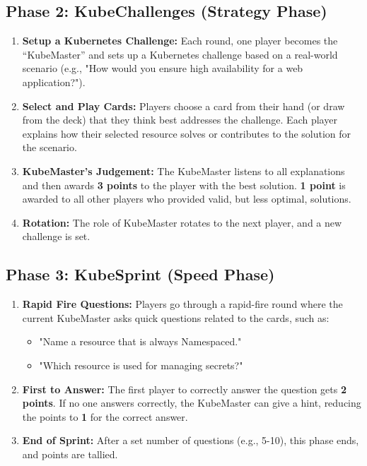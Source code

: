 \documentclass{article}
\begin{document}
\subsection*{Phase 2: KubeChallenges (Strategy Phase)}
\begin{enumerate}[label=\arabic*.]
    \item \textbf{Setup a Kubernetes Challenge:} Each round, one player becomes the “KubeMaster” and sets up a Kubernetes challenge based on a real-world scenario (e.g., "How would you ensure high availability for a web application?").
    
    \item \textbf{Select and Play Cards:} Players choose a card from their hand (or draw from the deck) that they think best addresses the challenge. Each player explains how their selected resource solves or contributes to the solution for the scenario.
    
    \item \textbf{KubeMaster's Judgement:} The KubeMaster listens to all explanations and then awards \textbf{3 points} to the player with the best solution. \textbf{1 point} is awarded to all other players who provided valid, but less optimal, solutions.
    
    \item \textbf{Rotation:} The role of KubeMaster rotates to the next player, and a new challenge is set.
\end{enumerate}

\subsection*{Phase 3: KubeSprint (Speed Phase)}
\begin{enumerate}[label=\arabic*.]
    \item \textbf{Rapid Fire Questions:} Players go through a rapid-fire round where the current KubeMaster asks quick questions related to the cards, such as:
    \begin{itemize}
        \item "Name a resource that is always Namespaced."
        \item "Which resource is used for managing secrets?"
    \end{itemize}
    
    \item \textbf{First to Answer:} The first player to correctly answer the question gets \textbf{2 points}. If no one answers correctly, the KubeMaster can give a hint, reducing the points to \textbf{1} for the correct answer.
    
    \item \textbf{End of Sprint:} After a set number of questions (e.g., 5-10), this phase ends, and points are tallied.
\end{enumerate}
\end{document}
